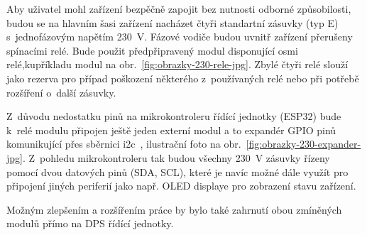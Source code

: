 Aby uživatel mohl zařízení bezpěčně zapojit bez nutnosti odborné způsobilosti, budou se na hlavním šasi zařízení nacházet čtyři standartní zásuvky (typ E) s~jednofázovým napětím \qty{230}{V}. Fázové vodiče budou uvnitř zařízení přerušeny spínacími relé. Bude použit předpřipravený modul disponující osmi relé,kupříkladu modul na obr.~\ref{fig:obrazky-230-rele-jpg}. Zbylé čtyři relé slouží jako rezerva pro případ poškození některého z~používaných relé nebo při potřebě rozšíření o~další zásuvky. 

Z~důvodu nedostatku pinů na mikrokontroleru řídící jednotky (ESP32) bude k~relé modulu připojen ještě jeden externí modul a to expandér GPIO pinů komunikující přes sběrnici \acs{i2c}~\cite{eshop-laskakit-expander}, ilustrační foto na obr.~\ref{fig:obrazky-230-expander-jpg}. Z~pohledu mikrokontroleru tak budou všechny \qty{230}{V} zásuvky řízeny pomocí dvou datových pinů (SDA, SCL), které je navíc možné dále využít pro připojení jiných periferií jako např. OLED displaye pro zobrazení stavu zařízení. 

Možným zlepšením a rozšířením práce by bylo také zahrnutí obou zmíněných modulů přímo na DPS řídící jednotky. 


